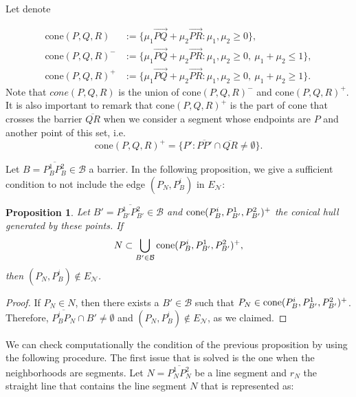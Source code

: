 \documentclass[a4paper]{elsarticle}
\newcommand{\EN}{{E^{}_{\mathcal N}}}
\newtheorem{prop}{Proposition}
\begin{document}
Let denote

\begin{align*}
\text{cone}(P,Q,R)&:=\{\mu_1 \overrightarrow{PQ}+\mu_2\overrightarrow{PR}:\mu_1,\mu_2\geq 0\},\\
\text{cone}(P,Q,R)^-&:=\{\mu_1 \overrightarrow{PQ}+\mu_2\overrightarrow{PR}:\mu_1,\mu_2\geq 0,\:\mu_1+\mu_2\leq 1\},\\
\text{cone}(P,Q,R)^+&:=\{\mu_1 \overrightarrow{PQ}+\mu_2\overrightarrow{PR}:\mu_1,\mu_2\geq 0,\:\mu_1+\mu_2\geq 1\}.
\end{align*}
Note that $cone(P, Q, R)$ is the union of $\text{cone}(P,Q,R)^-$ and $\text{cone}(P,Q,R)^+$. It is also important to remark that $\text{cone}(P,Q,R)^+$ is the part of cone that crosses the barrier $\overline{QR}$ when we consider a segment whose endpoints are $P$ and another point of this set, i.e.
$$\text{cone}(P,Q,R)^+=\{P':\overline{PP'}\cap\overline{QR}\neq\emptyset\}.$$

Let $B = \overline{P^1_BP^2_B}\in\mathcal B$ a barrier. In the following proposition, we give a sufficient condition to not include the edge $(P^{}_N, P^i_B)$ in $\EN$:

\begin{prop}

Let $B'=\overline{P^1_{B'}P^2_{B'}}\in\mathcal B$ and $\normalfont{\text{cone}}(P^i_B, P^1_{B'}, P^2_{B'})^+$ the conical hull generated by these points. If
$$N\subset\bigcup_{B'\in\mathcal B}\normalfont{\text{cone}}(P^i_B, P^1_{B'}, P^2_{B'})^+,$$
then $(P^{}_N, P^i_B)\not\in \EN$.

\end{prop}
\begin{proof}
If $P_N\in N$, then there exists a $B'\in\mathcal B$ such that 
$P_N\in \normalfont{\text{cone}}(P^i_B, P^1_{B'}, P^2_{B'})^+$. Therefore, $\overline{P^i_B P^{}_N}\cap B'\neq\emptyset$ and $(P^{}_N, P^i_B)\not\in \EN$, as we claimed.
\end{proof}

We can check computationally the condition of the previous proposition by using the following procedure. The first issue that is solved is the one when the neighborhoods are segments. Let $N = \overline{P^1_N P^2_N}$ be a line segment and $r_N$ the straight line that contains the line segment $N$ that is represented as:
\end{document}
